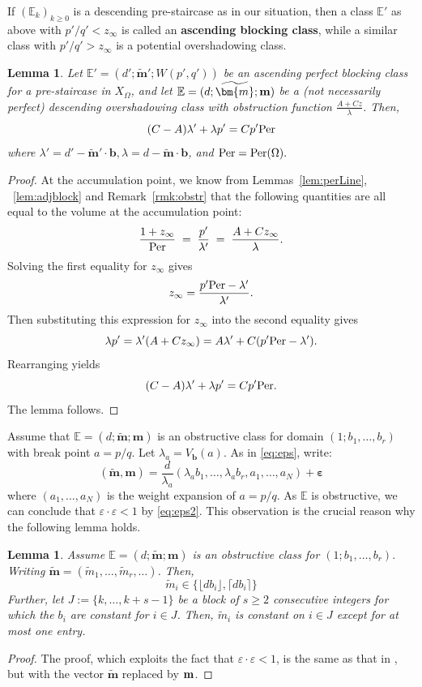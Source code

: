 \documentclass[11pt, reqno]{amsart}
\newtheorem{lemma}[thm]{Lemma}
\theoremstyle{remark}
\numberwithin{equation}{subsection}
\numberwithin{figure}{section}
\theoremstyle{customremark}
\newcommand{\Per}{{\rm Per}}
\newcommand{\Tm}{{\widetilde m}}
\newcommand{\bE}{{\mathbb E}}
\newcommand{\Om}{{\Omega}}
\newcommand{\la}{{\lambda}}
\newcommand{\eps}{\varepsilon}
\newcommand{\btm}{\widetilde{\bm{m}}}
\begin{document}
If $(\bE_k)_{k\ge 0}$ is a descending pre-staircase as in our situation, then a class $\bE'$ as above with $p'/q'< z_\infty$ is called an 
{\bf ascending blocking class}, while a similar class with  $p'/q'> z_\infty$ is a potential overshadowing class.



\begin{lemma}
\label{lem:os1}
    Let $\bE'=(d';\btm';W(p',q'))$ be an ascending perfect blocking class for a pre-staircase in $X_\Om$, and let $\bE=(d;\btm;{\bf m})$ be a (not necessarily perfect) descending overshadowing class with obstruction function $\frac{A+Cz}{\la}$. Then, 
    \begin{equation} \label{eq:OScondition}
         (C-A)\la'+\la p'=Cp' \Per
     \end{equation} 
    where $\la'=d'-\btm' \cdot \bm{b}, \la=d-\btm \cdot \bm{b}$, and $\Per = \Per(\Om).$
\end{lemma}
\begin{proof}
  At the accumulation point, we know from Lemmas~\ref{lem:perLine}, ~\ref{lem:adjblock} and Remark~\ref{rmk:obstr} that the following quantities are all equal to the volume at the accumulation point: 
    \[ \frac{1+z_\infty}{\Per}\;=\; \frac{p'}{\la'}\;=\;\frac{A+Cz_\infty}{\la}.\]
Solving the first equality for $z_\infty$ gives
\[
z_\infty=\frac{p'\Per-\lambda'}{\lambda'}.
\]
Then substituting this expression for $z_\infty$ into the second equality
gives
\[
\lambda p'
=
\lambda'(A+Cz_\infty)
=
A\lambda'+C(p'\Per-\lambda').
\]
Rearranging yields
\[
(C-A)\lambda'+\lambda p'=Cp'\Per.
\]
The lemma follows.
\end{proof}


Assume that $\bE=(d;\btm;\bm{m})$ is an obstructive class for domain $(1;b_1,\hdots,b_r)$ with  break point $a=p/q$. Let $\la_a=V_{\bm{b}}(a)$. As in \eqref{eq:eps}, write:
\[ (\btm,\bm{m})=\frac{d}{\la_a}(\la_a b_1,\hdots,\la_a b_r,a_1,\hdots,a_N)+\bm{\eps}\]
where $(a_1,\hdots,a_N)$ is the weight expansion of $a=p/q$.
As $\bE$ is obstructive, we can conclude that $\eps\cdot \eps<1$ by \eqref{eq:eps2}. 
This observation is the crucial reason why the following lemma holds.

\begin{lemma} \label{lem:btmD}
    Assume $\bE=(d;\btm;\bm{m})$ is an obstructive class for $(1;b_1,\hdots,b_r).$ Writing $\btm=(\widetilde{m}_1,\hdots,\widetilde{m}_r,\hdots)$. Then, 
    \[ \widetilde{m}_i \in \{\lfloor db_i \rfloor, \lceil db_i \rceil \}\]
    Further, let $J:=\{k,\hdots,k+s-1\}$ be a block of $s \geq 2$ consecutive integers for which the $b_i$ are constant for $i \in J$. Then, $\Tm_i$ is constant on $i \in J$ except for at most one entry.
\end{lemma}
\begin{proof}
 The proof, which exploits  the fact that $\eps\cdot \eps<1$,  is  the same as that in \cite[Lemma 2.1.7]{ball}, but with the vector $\btm$ replaced by $\bf{m}$.
    \end{proof}
\end{document}
